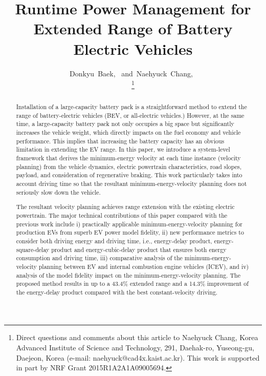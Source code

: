\documentclass{IEEEtran}
\begin{document}
\title{Runtime Power Management for Extended Range of Battery Electric Vehicles}

\author{
Donkyu~Baek,~ 
and~Naehyuck~Chang,~

\thanks{Direct questions and comments about this article to Naehyuck Chang, Korea Advanced Institute of Science and Technology, 291, Daehak-ro, Yuseong-gu, Daejeon, Korea (e-mail: naehyuck@cad4x.kaist.ac.kr). This work is supported in part by NRF Grant 2015R1A2A1A09005694.}
}

\maketitle

\begin{abstract}
Installation of a large-capacity battery pack is a straightforward method to extend the range of battery-electric vehicles (BEV, or all-electric vehicles.) However, at the same time, a large-capacity battery pack not only occupies a big space but significantly increases the vehicle weight, which directly impacts on the  fuel economy and vehicle performance. This implies that increasing the battery capacity has an obvious limitation in extending the EV range. In this paper, we introduce a system-level framework that derives the minimum-energy velocity at each time instance (velocity planning) from the vehicle dynamics, electric powertrain characteristics, road slopes, payload, and consideration of regenerative braking. This work particularly takes into account driving time so that the resultant minimum-energy-velocity planning does not seriously slow down the vehicle. 

The resultant velocity planning achieves range extension with the existing electric powertrain. The major technical contributions of this paper compared with the previous work include i) practically applicable minimum-energy-velocity planning for production EVs from superb EV power model fidelity, ii) new performance metrics to consider both driving energy and driving time, i.e., energy-delay product, energy-square-delay product and energy-cubic-delay product that ensures both energy consumption and driving time, iii) comparative analysis of the minimum-energy-velocity planning between EV and internal combustion engine vehicles (ICEV), and iv) analysis of the model fidelity impact on the minimum-energy-velocity planning. The proposed method results in up to a 43.4\% extended range and a 14.3\% improvement of the energy-delay product compared with the best constant-velocity driving.
\end{abstract}
\end{document}
